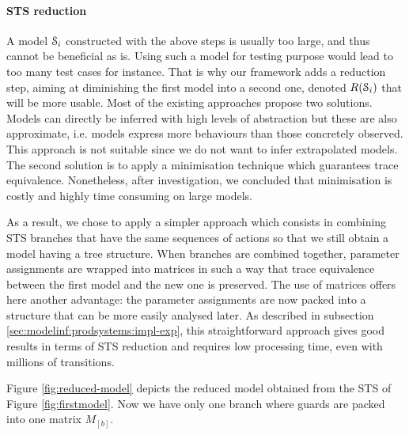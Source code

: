 \paragraph{STS reduction}
\label{part2:reduction}

A model $\EuScript{S}_i$ constructed with the above steps is
usually too large, and thus cannot be beneficial as is. Using
such a model for testing purpose would lead to too many test
cases for instance. That is why our framework adds a reduction
step, aiming at diminishing the first model into a second one,
denoted $R(\EuScript{S}_i)$ that will be more usable.
Most of the existing approaches propose two solutions. Models
can directly be inferred with high levels of abstraction but
these are also approximate, i.e. models express more behaviours
than those concretely observed. This approach is not suitable
since we do not want to infer extrapolated models. The second
solution is to apply a minimisation technique \cite{Abdulla06}
which guarantees trace equivalence. Nonetheless, after
investigation, we concluded that minimisation is costly and
highly time consuming on large models.


As a result, we chose to apply a simpler approach which consists
in combining STS branches that have the same sequences of actions
so that we still obtain a model having a tree structure. When
branches are combined together, parameter assignments are wrapped
into matrices in such a way that trace equivalence between the
first model and the new one is preserved. The use of matrices
offers here another advantage: the parameter assignments are now
packed into a structure that can be more easily analysed later.
As described in subsection \ref{sec:modelinf:prodsystems:impl-exp}, this
straightforward approach gives good results in terms of STS reduction and
requires low processing time, even with millions of transitions.

Figure \ref{fig:reduced-model} depicts the reduced model obtained
from the STS of Figure \ref{fig:firstmodel}. Now we have only one
branch where guards are packed into one matrix $M_{[b]}$.

